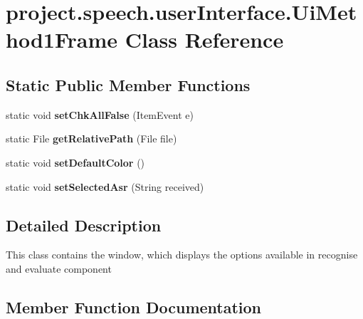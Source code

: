 \section{project.\+speech.\+user\+Interface.\+Ui\+Method1\+Frame Class Reference}
\label{classproject_1_1speech_1_1user_interface_1_1_ui_method1_frame}
\subsection*{Static Public Member Functions}
\begin{DoxyCompactItemize}
\item 
static void {\bf set\+Chk\+All\+False} (Item\+Event e)
\item 
static File {\bf get\+Relative\+Path} (File file)
\item 
static void {\bf set\+Default\+Color} ()
\item 
static void {\bf set\+Selected\+Asr} (String received)
\end{DoxyCompactItemize}


\subsection{Detailed Description}
This class contains the window, which displays the options available in recognise and evaluate component 

\subsection{Member Function Documentation}
